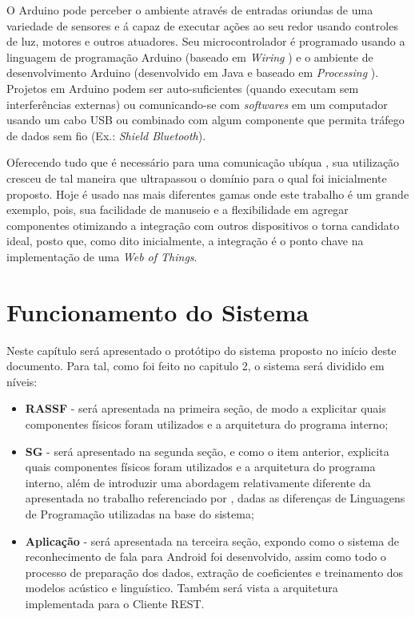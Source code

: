 \documentclass[12pt,a4paper,oneside]{report}
\begin{document}
O Arduino pode perceber o ambiente através de entradas oriundas de uma variedade de sensores e á capaz de executar ações ao seu redor usando controles de luz, motores e outros atuadores. Seu microcontrolador é programado usando a linguagem de programação Arduino \cite{arduinoapi} (baseado em \emph{Wiring} \cite{wiring}) e o ambiente de desenvolvimento Arduino (desenvolvido em Java e baseado em \emph{Processing} \cite{processing}). Projetos em Arduino podem ser auto-suficientes (quando executam sem interferências externas) ou comunicando-se com \emph{softwares} em um computador usando um cabo USB ou combinado com algum componente que permita tráfego de dados sem fio (Ex.: \emph{Shield Bluetooth}).

Oferecendo tudo que é necessário para uma comunicação ubíqua \cite{Mark Weiser}, sua utilização cresceu de tal maneira que ultrapassou o domínio para o qual foi inicialmente proposto. Hoje é usado nas mais diferentes gamas onde este trabalho é um grande exemplo, pois, sua facilidade de manuseio e a flexibilidade em agregar componentes otimizando a integração com outros dispositivos o torna candidato ideal, posto que, como dito inicialmente, a integração é o ponto chave na implementação de uma \emph{Web of Things}.

\chapter{Funcionamento do Sistema}
\label{chap:funcionamento}

Neste capítulo será apresentado o protótipo do sistema proposto no início deste documento. Para tal, como foi feito no capitulo 2, o sistema será dividido em níveis:

\begin{itemize}
    \item \textbf{RASSF} - será apresentada na primeira seção, de modo a explicitar quais componentes físicos foram utilizados e a arquitetura do programa interno;
    \item \textbf{SG} - será apresentado na segunda seção, e como o item anterior, explicita quais componentes físicos foram utilizados e a arquitetura do programa interno, além de introduzir uma abordagem relativamente diferente da apresentada no trabalho referenciado por \cite{sgtriwiguiboh}, dadas as diferenças de Linguagens de Programação utilizadas na base do sistema;
    \item \textbf{Aplicação} -  será apresentada na terceira seção, expondo como o sistema de reconhecimento de fala para Android foi desenvolvido, assim como todo o processo de preparação dos dados, extração de coeficientes e treinamento dos modelos acústico e linguístico. Também será vista a arquitetura implementada para o Cliente REST.
\end{itemize}
\end{document}
